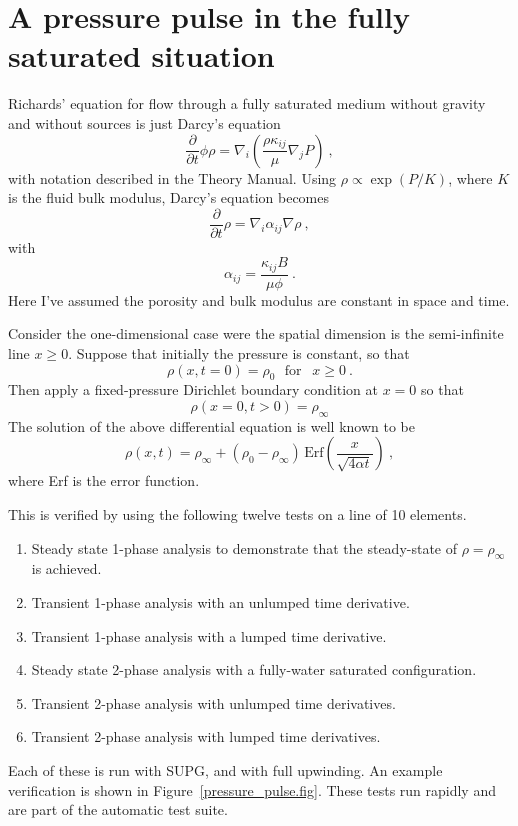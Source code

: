 \documentclass[]{scrreprt}
\begin{document}
\chapter{A pressure pulse in the fully saturated situation}
\label{pp}

Richards' equation for flow through a fully saturated medium without
gravity and without sources is just Darcy's equation
\begin{equation}
\frac{\partial}{\partial t}\phi\rho = \nabla_{i}\left(\frac{\rho
  \kappa_{ij}}{\mu} \nabla_{j}P \right) \ ,
\end{equation}
with notation described in the Theory Manual.  Using $\rho \propto
\exp(P/K)$, where $K$ is the fluid bulk modulus, Darcy's equation
becomes
\begin{equation}
\frac{\partial}{\partial t}\rho = \nabla_{i}\alpha_{ij}\nabla\rho \ ,
\end{equation}
with 
\begin{equation}
\alpha_{ij} = \frac{\kappa_{ij}B}{\mu\phi} \ .
\end{equation}
Here I've assumed the porosity and bulk modulus are constant in space
and time.

Consider the one-dimensional case were the spatial dimension is the
semi-infinite line $x\geq 0$.  Suppose that initially the pressure is
constant, so that
\begin{equation}
\rho(x, t=0) = \rho_{0} \ \ \ \mbox{for }\ \ x\geq 0 \ .
\end{equation}
Then apply a fixed-pressure Dirichlet boundary condition at $x=0$ so
that
\begin{equation}
\rho(x=0, t>0) = \rho_{\infty}
\end{equation}
The solution of the above differential equation is well known to be
\begin{equation}
\rho(x, t) = \rho_{\infty} + (\rho_{0} -
\rho_{\infty})\,\mbox{Erf}\left( \frac{x}{\sqrt{4\alpha t}} \right) \ ,
\label{eqn.exact.pp}
\end{equation}
where Erf is the error function.

This is verified by using the following twelve tests on a line of
10 elements.
\begin{enumerate}
\item Steady state 1-phase analysis to demonstrate that the
  steady-state of $\rho = \rho_{\infty}$ is achieved.
\item Transient 1-phase analysis with an unlumped time derivative.
\item Transient 1-phase analysis with a lumped time derivative.
\item Steady state 2-phase analysis with a fully-water saturated configuration. 
\item Transient 2-phase analysis with unlumped time derivatives.
\item Transient 2-phase analysis with lumped time derivatives.
\end{enumerate}
Each of these is run with SUPG, and with full upwinding.
An example verification is shown in Figure~\ref{pressure_pulse.fig}.
These tests run rapidly and are part of the automatic test suite.
\end{document}
